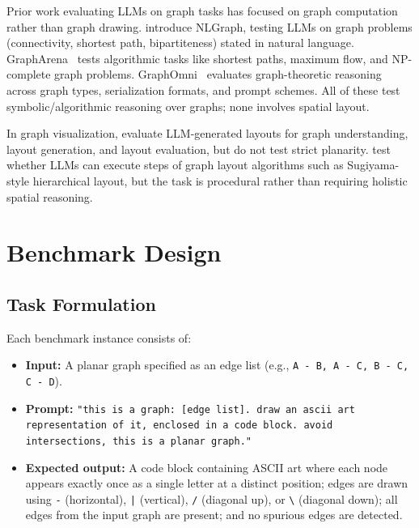 \documentclass{article}
\begin{document}
Prior work evaluating LLMs on graph tasks has focused on graph computation rather than graph drawing. \citet{wang2023} introduce NLGraph, testing LLMs on graph problems (connectivity, shortest path, bipartiteness) stated in natural language. GraphArena~\citep{tang2025} tests algorithmic tasks like shortest paths, maximum flow, and NP-complete graph problems. GraphOmni~\citep{xu2026} evaluates graph-theoretic reasoning across graph types, serialization formats, and prompt schemes. All of these test symbolic/algorithmic reasoning over graphs; none involves spatial layout.

In graph visualization, \citet{fan2025} evaluate LLM-generated layouts for graph understanding, layout generation, and layout evaluation, but do not test strict planarity. \citet{dibartolomeo2023} test whether LLMs can execute steps of graph layout algorithms such as Sugiyama-style hierarchical layout, but the task is procedural rather than requiring holistic spatial reasoning.

\section{Benchmark Design}

\subsection{Task Formulation}

Each benchmark instance consists of:
\begin{itemize}[nosep]
  \item \textbf{Input:} A planar graph specified as an edge list (e.g., \texttt{A - B, A - C, B - C, C - D}).
  \item \textbf{Prompt:} \texttt{"this is a graph: [edge list]. draw an ascii art representation of it, enclosed in a code block. avoid intersections, this is a planar graph."}
  \item \textbf{Expected output:} A code block containing ASCII art where each node appears exactly once as a single letter at a distinct position; edges are drawn using \texttt{-} (horizontal), \texttt{|} (vertical), \texttt{/} (diagonal up), or \texttt{\textbackslash} (diagonal down); all edges from the input graph are present; and no spurious edges are detected.
\end{itemize}
\end{document}
